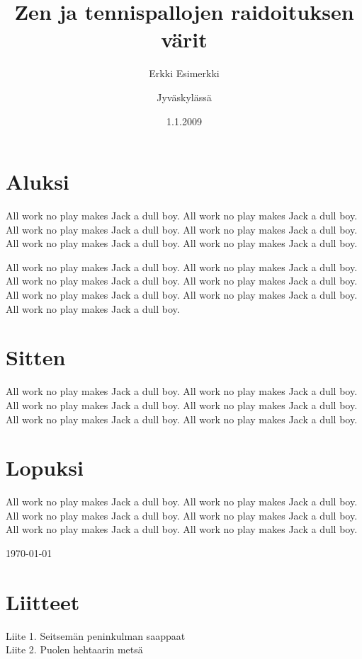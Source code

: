 \documentclass{vakioasiakirja}
\author{Erkki Esimerkki}
\date{1.1.2009}
\title{Zen ja tennispallojen raidoituksen värit}
\begin{document}
\maketitle

\section{Aluksi}

\align All work no play makes Jack a dull boy. All work no play makes Jack a dull boy. All work no play makes Jack a dull boy. All work no play makes Jack a dull boy. All work no play makes Jack a dull boy. All work no play makes Jack a dull boy.

All work no play makes Jack a dull boy. All work no play makes Jack a dull boy. All work no play makes Jack a dull boy. All work no play makes Jack a dull boy. All work no play makes Jack a dull boy. All work no play makes Jack a dull boy. All work no play makes Jack a dull boy.

\section{Sitten}

\align All work no play makes Jack a dull boy. All work no play makes Jack a dull boy. All work no play makes Jack a dull boy. All work no play makes Jack a dull boy. All work no play makes Jack a dull boy. All work no play makes Jack a dull boy.

\section{Lopuksi}

\align All work no play makes Jack a dull boy. All work no play makes Jack a dull boy. All work no play makes Jack a dull boy. All work no play makes Jack a dull boy. All work no play makes Jack a dull boy. All work no play makes Jack a dull boy.

\signature{Jyväskylässä}{\today}

\vfill

\section{Liitteet}

\align
Liite 1. Seitsemän peninkulman saappaat \\
Liite 2. Puolen hehtaarin metsä

\nopagenum
\end{document}
